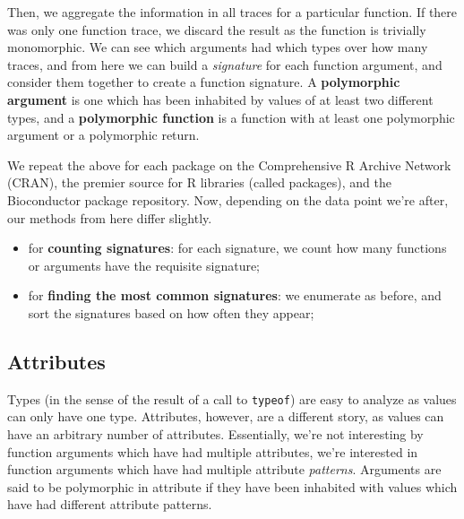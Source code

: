 \documentclass[acmsmall,10pt,review,anonymous]{acmart}\settopmatter{printfolios=true,printccs=false,printacmref=false}
\begin{document}
Then, we aggregate the information in all traces for a particular function.
If there was only one function trace, we discard the result as the function
is trivially monomorphic.  We can see which arguments had which types over
how many traces, and from here we can build a \textit{signature} for each
function argument, and consider them together to create a function
signature.  A \textbf{polymorphic argument} is one which has been inhabited
by values of at least two different types, and a \textbf{polymorphic
  function} is a function with at least one polymorphic argument or a
polymorphic return.

We repeat the above for each package on the Comprehensive R Archive Network
(CRAN), the premier source for R libraries (called packages), and the
Bioconductor package repository.  Now, depending on the data point we're
after, our methods from here differ slightly.

\begin{itemize}
    \item for \textbf{counting signatures}: for each signature, we count how
      many functions or arguments have the requisite signature;
    \item for \textbf{finding the most common signatures}: we enumerate as
      before, and sort the signatures based on how often they appear;
\end{itemize}

%
%
%
%
\subsection{Attributes}
\label{sec:method:attributes}

Types (in the sense of the result of a call to {\tt typeof}) are easy to
analyze as values can only have one type.  Attributes, however, are a
different story, as values can have an arbitrary number of attributes.
Essentially, we're not interesting by function arguments which have had
multiple attributes, we're interested in function arguments which have had
multiple attribute \textit{patterns}. 
Arguments are said to be polymorphic in attribute if they have been
inhabited with values which have had different attribute patterns.  

\end{document}
